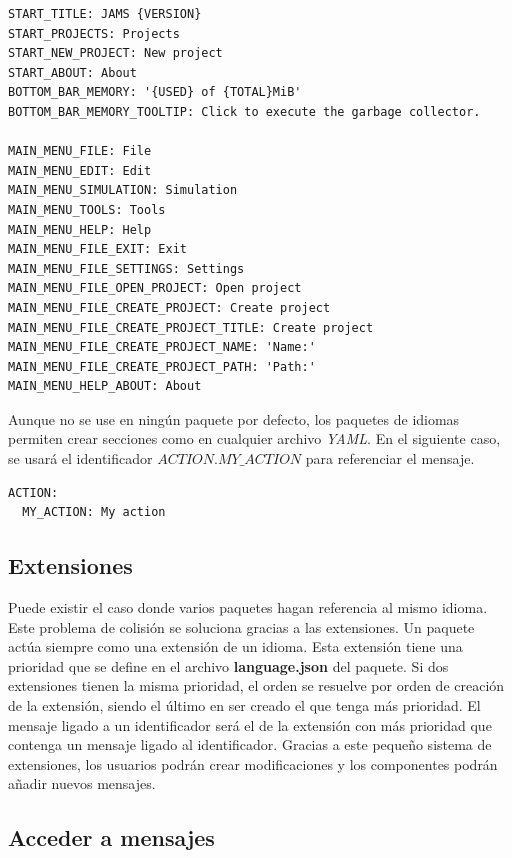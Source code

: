 \begin{lstlisting}[frame=single,label={lst:interface.yml}]
START_TITLE: JAMS {VERSION}
START_PROJECTS: Projects
START_NEW_PROJECT: New project
START_ABOUT: About
BOTTOM_BAR_MEMORY: '{USED} of {TOTAL}MiB'
BOTTOM_BAR_MEMORY_TOOLTIP: Click to execute the garbage collector.

MAIN_MENU_FILE: File
MAIN_MENU_EDIT: Edit
MAIN_MENU_SIMULATION: Simulation
MAIN_MENU_TOOLS: Tools
MAIN_MENU_HELP: Help
MAIN_MENU_FILE_EXIT: Exit
MAIN_MENU_FILE_SETTINGS: Settings
MAIN_MENU_FILE_OPEN_PROJECT: Open project
MAIN_MENU_FILE_CREATE_PROJECT: Create project
MAIN_MENU_FILE_CREATE_PROJECT_TITLE: Create project
MAIN_MENU_FILE_CREATE_PROJECT_NAME: 'Name:'
MAIN_MENU_FILE_CREATE_PROJECT_PATH: 'Path:'
MAIN_MENU_HELP_ABOUT: About
\end{lstlisting}

\noindent Aunque no se use en ningún paquete por defecto,
los paquetes de idiomas permiten crear secciones como
en cualquier archivo \textit{YAML}.
En el siguiente caso, se usará el identificador
$ACTION.MY\_ACTION$ para referenciar el mensaje.

\begin{lstlisting}[frame=single,label={lst:yaml-subsection}]
ACTION:
  MY_ACTION: My action
\end{lstlisting}

\subsection{Extensiones}\label{subsec:idiomas-extensiones}

Puede existir el caso donde varios paquetes hagan referencia al mismo idioma.
Este problema de colisión se soluciona gracias a las extensiones.
Un paquete actúa siempre como una extensión de un idioma.
Esta extensión tiene una prioridad que se define en el archivo
\textbf{language.json} del paquete.
Si dos extensiones tienen la misma prioridad, el orden se resuelve
por orden de creación de la extensión, siendo el último en ser creado
el que tenga más prioridad.
El mensaje ligado a un identificador será el de la extensión con más prioridad
que contenga un mensaje ligado al identificador.
Gracias a este pequeño sistema de extensiones, los usuarios podrán crear modificaciones
y los componentes podrán añadir nuevos mensajes.

\subsection{Acceder a mensajes}\label{subsec:acceder-a-mensajes}


